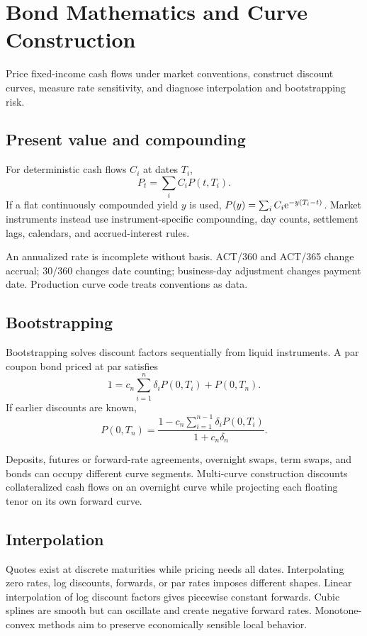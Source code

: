 \chapter{Bond Mathematics and Curve Construction}

\begin{objectives}
Price fixed-income cash flows under market conventions, construct discount curves,
measure rate sensitivity, and diagnose interpolation and bootstrapping risk.
\end{objectives}

\section{Present value and compounding}

For deterministic cash flows $C_i$ at dates $T_i$,
\[
P_t=\sum_i C_iP(t,T_i).
\]
If a flat continuously compounded yield $y$ is used,
$P(y)=\sum_iC_i\mathrm e^{-y(T_i-t)}$. Market instruments instead use instrument-specific
compounding, day counts, settlement lags, calendars, and accrued-interest rules.

An annualized rate is incomplete without basis. ACT/360 and ACT/365 change accrual;
30/360 changes date counting; business-day adjustment changes payment date.
Production curve code treats conventions as data.

\section{Bootstrapping}

Bootstrapping solves discount factors sequentially from liquid instruments. A par
coupon bond priced at par satisfies
\[
1=c_n\sum_{i=1}^n\delta_iP(0,T_i)+P(0,T_n).
\]
If earlier discounts are known,
\[
P(0,T_n)=
\frac{1-c_n\sum_{i=1}^{n-1}\delta_iP(0,T_i)}
{1+c_n\delta_n}.
\]

Deposits, futures or forward-rate agreements, overnight swaps, term swaps, and bonds
can occupy different curve segments. Multi-curve construction discounts
collateralized cash flows on an overnight curve while projecting each floating tenor
on its own forward curve.

\section{Interpolation}

Quotes exist at discrete maturities while pricing needs all dates. Interpolating
zero rates, log discounts, forwards, or par rates imposes different shapes.
Linear interpolation of log discount factors gives piecewise constant forwards.
Cubic splines are smooth but can oscillate and create negative forward rates.
Monotone-convex methods aim to preserve economically sensible local behavior.


